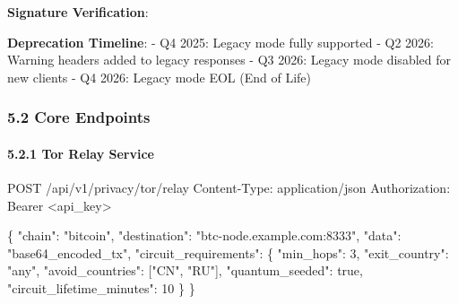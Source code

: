 \documentclass[
  11pt,
]{article}
\newenvironment{Shaded}{\begin{snugshade}}{\end{snugshade}}
\newcommand{\FunctionTok}[1]{\textcolor[rgb]{0.00,0.00,0.00}{#1}}
\newcommand{\KeywordTok}[1]{\textcolor[rgb]{0.13,0.29,0.53}{\textbf{#1}}}
\newcommand{\NormalTok}[1]{#1}
\newcommand{\OperatorTok}[1]{\textcolor[rgb]{0.81,0.36,0.00}{\textbf{#1}}}
\newcommand{\SpecialCharTok}[1]{\textcolor[rgb]{0.00,0.00,0.00}{#1}}
\newcommand{\VerbatimStringTok}[1]{\textcolor[rgb]{0.31,0.60,0.02}{#1}}
\begin{document}
\textbf{Signature Verification}:

\begin{Shaded}
\end{Shaded}

\textbf{Deprecation Timeline}: - Q4 2025: Legacy mode fully supported -
Q2 2026: Warning headers added to legacy responses - Q3 2026: Legacy
mode disabled for new clients - Q4 2026: Legacy mode EOL (End of Life)

\hypertarget{core-endpoints}{%
\subsubsection{5.2 Core Endpoints}\label{core-endpoints}}

\hypertarget{tor-relay-service}{%
\paragraph{5.2.1 Tor Relay Service}\label{tor-relay-service}}

\begin{Shaded}
\begin{Highlighting}[]
\NormalTok{POST /api/v1/privacy/tor/relay}
\NormalTok{Content{-}Type: application/json}
\NormalTok{Authorization: Bearer \textless{}api\_key\textgreater{}}

\NormalTok{\{}
\NormalTok{  "chain": "bitcoin",}
\NormalTok{  "destination": "btc{-}node.example.com:8333",}
\NormalTok{  "data": "base64\_encoded\_tx",}
\NormalTok{  "circuit\_requirements": \{}
\NormalTok{    "min\_hops": 3,}
\NormalTok{    "exit\_country": "any",}
\NormalTok{    "avoid\_countries": ["CN", "RU"],}
\NormalTok{    "quantum\_seeded": true,}
\NormalTok{    "circuit\_lifetime\_minutes": 10}
\NormalTok{  \}}
\NormalTok{\}}
\end{Highlighting}
\end{Shaded}
\end{document}
